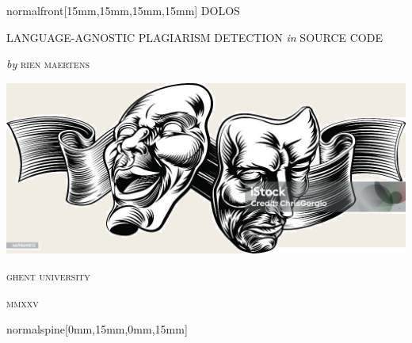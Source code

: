 \documentclass[coverheight=240mm,coverwidth=170mm,spinewidth=15mm]{bookcover}
\begin{document}
\begin{bookcover}
    \begin{bookcoverelement}{normal}{front}[15mm,15mm,15mm,15mm]%
        \centering
        \fontsize{34pt}{44pt}\selectfont DOLOS \par
        \vspace*{-0.5cm} \par
         \par
        \vspace*{0.1cm} \par
        \fontsize{30pt}{34pt}\selectfont LANGUAGE-AGNOSTIC PLAGIARISM DETECTION \textit{in} SOURCE CODE \par
        \vspace*{1.5cm}
        \fontsize{20pt}{23pt}\selectfont\textit{\fontsize{15pt}{23pt}\selectfont by} \textsc{rien maertens} \par
        \vspace*{\fill}
        \includegraphics[width=0.8\partwidth]{istockphoto-469869812-1024x1024} \par
        \vspace*{\fill}
        \fontsize{15pt}{18pt}\selectfont\textsc{ghent university} \par
        \fontsize{12pt}{15pt}\selectfont\textsc{mmxxv}
    \end{bookcoverelement}
    \begin{bookcoverelement}{normal}{spine}[0mm,15mm,0mm,15mm]%
        \centering
         \par
        \vspace*{\fill}
    \end{bookcoverelement}

\end{bookcover}
\end{document}

